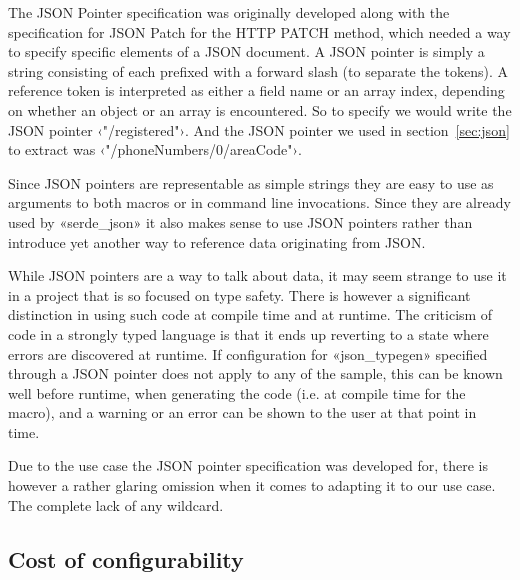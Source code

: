 The JSON Pointer specification\cite{RFC6901} was originally developed along with the specification for JSON Patch\cite{RFC6902} for the HTTP PATCH method, which needed a way to specify specific elements of a JSON document. A JSON pointer is simply a string consisting of  each prefixed with a forward slash (to separate the tokens). A reference token is interpreted as either a field name or an array index, depending on whether an object or an array is encountered. So to specify  we would write the JSON pointer ‹"/registered"›. And the JSON pointer we used in section~\ref{sec:json} to extract  was ‹"/phoneNumbers/0/areaCode"›.

Since JSON pointers are representable as simple strings they are easy to use as arguments to both macros or in command line invocations. Since they are already used by «serde_json» it also makes sense to use JSON pointers rather than introduce yet another way to reference data originating from JSON.

While JSON pointers are a  way to talk about data, it may seem strange to use it in a project that is so focused on type safety. There is however a significant distinction in using such code at compile time and at runtime. The criticism of  code in a strongly typed language is that it ends up reverting to a state where errors are discovered at runtime. If configuration for «json_typegen» specified through a JSON pointer does not apply to any of the sample, this can be known well before runtime, when generating the code (i.e. at compile time for the macro), and a warning or an error can be shown to the user at that point in time.


Due to the use case the JSON pointer specification was developed for, there is however a rather glaring omission when it comes to adapting it to our use case. The complete lack of any wildcard.



\subsection{Cost of configurability}

